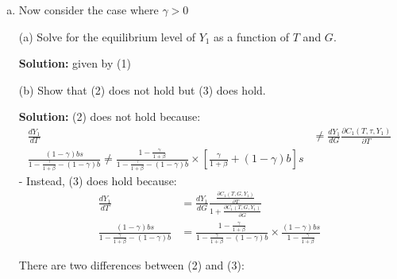 \documentclass[11pt]{extarticle}
\theoremstyle{plain}
\theoremstyle{definition}
\begin{document}
\begin{enumerate}[(a)]
(e.2) Show that:
$$
\frac{d Y_1}{d T}=\frac{d Y_1}{d G} \frac{\partial C_1\left(T, \tau, Y_1\right)}{\partial T}
$$
and also:
$$
\frac{d Y_1}{d T}=\frac{d Y_1}{d G} \frac{\frac{\partial C_1\left(T, G, Y_1\right)}{\partial T}}{1+\frac{\partial C_1\left(T, G, Y_1\right)}{\partial G}}
$$
\textbf{Solution:} (2) holds because:
$$
\begin{aligned}
\frac{d Y_1}{d T} &=\frac{d Y_1}{d G} \frac{\partial C_1\left(T, \tau, Y_1\right)}{\partial T} \\
\frac{b s}{1-b} &=\frac{1}{1-b} \times b s
\end{aligned}
$$
and (3) holds because:
$$
\begin{aligned}
\frac{d Y_1}{d T} &=\frac{d Y_1}{d G} \frac{\frac{\partial C_1\left(T, G, Y_1\right)}{\partial T}}{1+\frac{\partial C_1\left(T, G, Y_1\right)}{\partial G}} \\
\frac{b s}{1-b} &=\frac{1}{1-b} \times \frac{b s}{1+0}
\end{aligned}
$$

\item Now consider the case where $\gamma>0$

(a) Solve for the equilibrium level of $Y_1$ as a function of $T$ and $G$.

\textbf{Solution:} given by (1)

(b) Show that (2) does not hold but (3) does hold.

\textbf{Solution:} (2) does not hold because:
$$
\begin{aligned}
\frac{d Y_1}{d T} & \neq \frac{d Y_1}{d G} \frac{\partial C_1\left(T, \tau, Y_1\right)}{\partial T} \\
\frac{(1-\gamma) b s}{1-\frac{\gamma}{1+\beta}-(1-\gamma) b} \neq \frac{1-\frac{\gamma}{1+\beta}}{1-\frac{\gamma}{1+\beta}-(1-\gamma) b} \times\left[\frac{\gamma}{1+\beta}+(1-\gamma) b\right] s
\end{aligned}
$$
- Instead, (3) does hold because:
$$
\begin{aligned}
\frac{d Y_1}{d T} &=\frac{d Y_1}{d G} \frac{\frac{\partial C_1\left(T, G, Y_1\right)}{\partial T}}{1+\frac{\partial C_1\left(T, G, Y_1\right)}{\partial G}} \\
\frac{(1-\gamma) b s}{1-\frac{\gamma}{1+\beta}-(1-\gamma) b} &=\frac{1-\frac{\gamma}{1+\beta}}{1-\frac{\gamma}{1+\beta}-(1-\gamma) b} \times \frac{(1-\gamma) b s}{1-\frac{\gamma}{1+\beta}}
\end{aligned}
$$

There are two differences between (2) and (3):


\end{enumerate}
\end{document}
